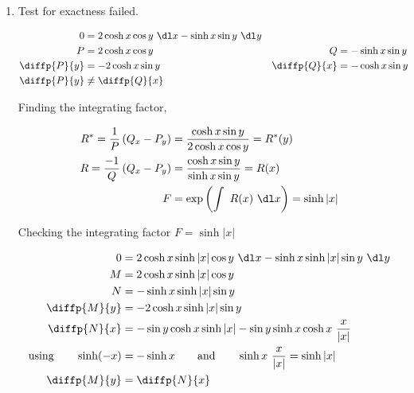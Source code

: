 \begin{enumerate}
    \item Test for exactness failed.

          \begin{align}
              0            & = 2 \cosh x \cos y\ \dl x - \sinh x \sin y \ \dl y   \\
              P            & = 2\cosh x \cos y                                  &
              Q            & = -\sinh x \sin y                                    \\
              \diffp{P}{y} & = -2 \cosh x \sin y                                &
              \diffp{Q}{x} & = -\cosh x \sin y                                    \\
              \diffp{P}{y} & \neq \diffp{Q}{x}
          \end{align}

          Finding the integrating factor,

          \begin{align}
              R^{*} = \frac{1}{P} \left( Q_{x} - P_{y}
              \right) & = \frac{\cosh x \sin y}{2 \cosh x \cos y}    = R^{*}(y) \\
              R = \frac{-1}{Q}\left( Q_{x} - P_{y}
              \right) & = \frac{\cosh x \sin y}{\sinh x \sin y}  = R(x)         \\
              F       & = \exp \left( \int\ R(x)\ \dl x \right) = \sinh |x|
          \end{align}

          Checking the integrating factor $ F = \sinh |x| $

          \begin{align}
              0            & =2 \cosh x \sinh |x| \cos y\ \dl x - \sinh x
              \sinh |x| \sin y \ \dl y                                            \\
              M            & = 2 \cosh x \sinh |x| \cos y                         \\
              N            & =  - \sinh x \sinh |x| \sin y                        \\
              \diffp{M}{y} & = -2 \cosh x \sinh |x| \sin y                        \\
              \diffp{N}{x} & = -\sin y \cosh x \sinh |x| - \sin y \sinh x \cosh x
              \ \frac{x}{|x|}                                                     \\
              \text{using} \qquad \sinh(-x)
                           & = -\sinh x \qquad \text{and} \qquad \sinh x
              \ \frac{x}{|x|} = \sinh |x|                                         \\
              \diffp{M}{y} & = \diffp{N}{x}
          \end{align}


\end{enumerate}
